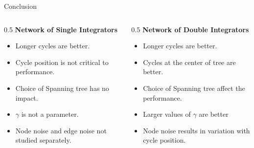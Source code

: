 \begin{frame}{}
	\vspace{-0.1cm}
	\begin{block}{Conclusion}
		\begin{columns}
			\vspace{-5cm}
			\begin{column}{0.5\textwidth}
				\centering
				\textbf{Network of Single Integrators\footnotemark[1]}
				\begin{itemize}
					\item Longer cycles are better.
					\item Cycle position is not critical to performance.
					\item Choice of Spanning tree has no impact.
					\item $\gamma$ is not a parameter.
					\item Node noise and edge noise not studied separately.
				\end{itemize}
			\end{column}
			\begin{column}{0.5\textwidth}
				\centering
				\textbf{Network of Double Integrators}
				\begin{itemize}
					\item Longer cycles are better.
					\item Cycles at the center of tree are better.
					\item Choice of Spanning tree affect the performance.
					\item Larger values of $\gamma$ are better
					\item Node noise results in variation with cycle position.
				\end{itemize}
			\end{column}
		\end{columns}
	\end{block}
\end{frame}

